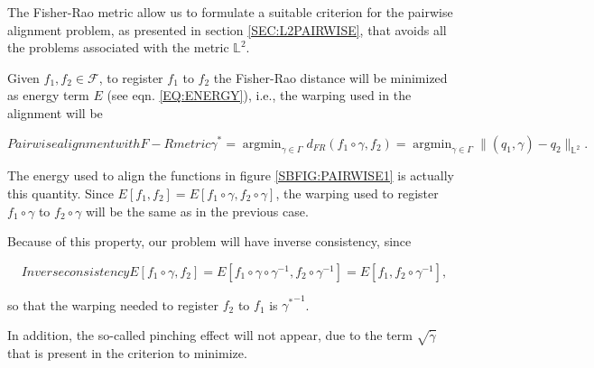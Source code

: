 
The Fisher-Rao metric allow us to formulate a suitable criterion for the
pairwise alignment problem, as presented in section \ref{SEC:L2PAIRWISE},
 that avoids all the problems associated with the metric $\mathbb{L}^2$.

Given $f_1, f_2 \in \mathscr{F}$, to register $f_1$ to $f_2$ the Fisher-Rao distance
will be minimized as energy term $E$ (see eqn. \ref{EQ:ENERGY}), i.e.,
the warping used in the alignment will be

\begin{equation}[EQ:DPAELASTIC]{Pairwise alignment with F-R metric}
\gamma^{*}= \operatorname{argmin}_{\gamma \in \Gamma} d_{FR}(f_1 \circ \gamma,
f_2) = \operatorname{argmin}_{\gamma \in \Gamma} \|
(q_1, \gamma) - q_2 \|_{\mathbb{L}^2}.
\end{equation}

The energy used to align the functions in figure \ref{SBFIG:PAIRWISE1} is
actually this quantity.
Since
$E[f_1, f_2] = E[f_1 \circ \gamma, f_2 \circ \gamma]$, the warping used to
register $f_1 \circ \gamma$ to $f_2 \circ \gamma$ will be the same as in the
previous case.

Because of this property, our problem will have inverse consistency, since

\begin{equation}[]{Inverse consistency}
E[f_1 \circ \gamma, f_2] = E[f_1 \circ \gamma \circ \gamma^{-1}, f_2
\circ \gamma^{-1}] = E[f_1, f_2 \circ \gamma^{-1}],
\end{equation}

so that the warping needed to register $f_2$ to $f_1$  is ${\gamma^*}^{-1}$.


In addition, the so-called pinching effect will not appear, due to the term
$\sqrt{\dot \gamma}$ that is present in the criterion to minimize.

